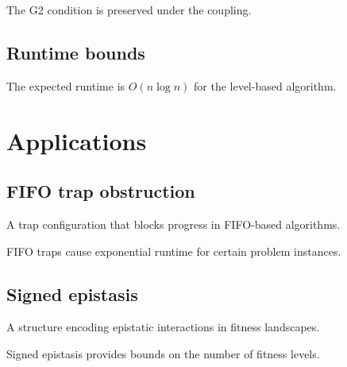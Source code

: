 \begin{lemma}[G2 monotonicity]
  \label{lem:g2_monotonicity}
  The G2 condition is preserved under the coupling.
  \notready
\end{lemma}

\section{Runtime bounds}
\begin{theorem}
  \label{thm:runtime_bound}
  The expected runtime is $O(n \log n)$ for the level-based algorithm.
  \leanok
\end{theorem}

\chapter{Applications}

\section{FIFO trap obstruction}
\begin{definition}
  \label{def:fifo_trap}
  A trap configuration that blocks progress in FIFO-based algorithms.
\end{definition}

\begin{theorem}
  \label{thm:fifo_trap_runtime}
  FIFO traps cause exponential runtime for certain problem instances.
  \leanok
\end{theorem}

\section{Signed epistasis}
\begin{definition}
  \label{def:epistasis}
  A structure encoding epistatic interactions in fitness landscapes.
\end{definition}

\begin{lemma}
  \label{lem:epistasis_bounds}
  Signed epistasis provides bounds on the number of fitness levels.
  \leanok
\end{lemma}

